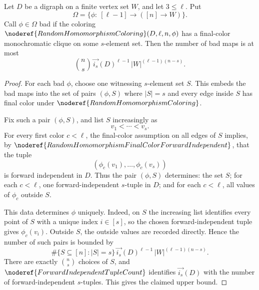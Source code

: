 \begin{helper}
Let \(D\) be a digraph on a finite vertex set \(W\), and let \(3\le \ell\).
Put
\[
  \Omega=\{\phi:\ [\ell-1]\to([n]\to W)\}.
\]
Call \(\phi\in\Omega\) bad if the coloring
\(\noderef{RandomHomomorphismColoring}(D,\ell,n,\phi)\) has a final-color
monochromatic clique on some \(s\)-element set.  Then the number of bad maps is
at most
\[
  \binom ns\,
  \overrightarrow{i_s}(D)^{\ell-1}\,
  |W|^{(\ell-1)(n-s)}.
\]
\end{helper}
\begin{proof}
For each bad \(\phi\), choose one witnessing \(s\)-element set \(S\).  This
embeds the bad maps into the set of pairs \((\phi,S)\) where \(|S|=s\) and
every edge inside \(S\) has final color under
\(\noderef{RandomHomomorphismColoring}\).

Fix such a pair \((\phi,S)\), and list \(S\) increasingly as
\[
  v_1<\cdots <v_s .
\]
For every first color \(c<\ell\), the final-color assumption on all edges of
\(S\) implies, by \(\noderef{RandomHomomorphismFinalColorForwardIndependent}\),
that the tuple
\[
  (\phi_c(v_1),\ldots,\phi_c(v_s))
\]
is forward independent in \(D\).  Thus the pair \((\phi,S)\) determines:
the set \(S\); for each \(c<\ell\), one forward-independent \(s\)-tuple in
\(D\); and for each \(c<\ell\), all values of \(\phi_c\) outside \(S\).

This data determines \(\phi\) uniquely.  Indeed, on \(S\) the increasing list
identifies every point of \(S\) with a unique index \(i\in[s]\), so the chosen
forward-independent tuple gives \(\phi_c(v_i)\).  Outside \(S\), the outside
values are recorded directly.  Hence the number of such pairs is bounded by
\[
  \#\{S\subseteq[n]: |S|=s\}\,
  \overrightarrow{i_s}(D)^{\ell-1}\,
  |W|^{(\ell-1)(n-s)}.
\]
There are exactly \(\binom ns\) choices of \(S\), and
\(\noderef{ForwardIndependentTupleCount}\) identifies
\(\overrightarrow{i_s}(D)\) with the number of forward-independent
\(s\)-tuples.  This gives the claimed upper bound.
\end{proof}

